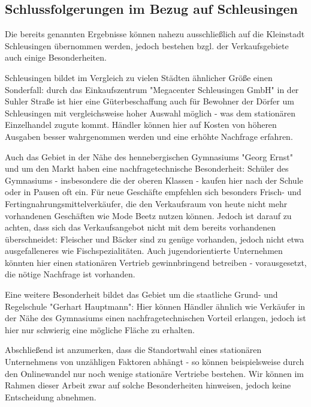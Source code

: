 \documentclass[a4paper, 12pt]{scrartcl}
\begin{document}
        \subsection{Schlussfolgerungen im Bezug auf Schleusingen}
        
        
        
        
        
        
        Die bereits genannten Ergebnisse können nahezu ausschließlich auf die Kleinstadt Schleusingen übernommen werden, jedoch bestehen bzgl. der Verkaufsgebiete auch einige Besonderheiten.

Schleusingen bildet im Vergleich zu vielen Städten ähnlicher Größe einen Sonderfall: durch das Einkaufszentrum "Megacenter Schleusingen GmbH" in der Suhler Straße ist hier eine Güterbeschaffung auch für Bewohner der Dörfer um Schleusingen mit vergleichsweise hoher Auswahl möglich - was dem stationären Einzelhandel zugute kommt. Händler können hier auf Kosten von höheren Ausgaben besser wahrgenommen werden und eine erhöhte Nachfrage erfahren. 

Auch das Gebiet in der Nähe des hennebergischen Gymnasiums "Georg Ernst" und um den Markt haben eine nachfragetechnische Besonderheit: Schüler des Gymnasiums - insbesondere die der oberen Klassen - kaufen hier nach der Schule oder in Pausen oft ein. Für neue Geschäfte empfehlen sich besonders Frisch- und Fertingnahrungsmittelverkäufer, die den Verkaufsraum von heute nicht mehr vorhandenen Geschäften wie Mode Beetz nutzen können. Jedoch ist darauf zu achten, dass sich das Verkaufsangebot nicht mit dem bereits vorhandenen überschneidet: Fleischer und Bäcker sind zu genüge vorhanden, jedoch nicht etwa ausgefalleneres wie Fischspezialitäten. Auch jugendorientierte Unternehmen könnten hier einen stationären Vertrieb gewinnbringend betreiben - vorausgesetzt, die nötige Nachfrage ist vorhanden.

Eine weitere Besonderheit bildet das Gebiet um die staatliche Grund- und Regelschule "Gerhart Hauptmann": Hier können Händler ähnlich wie Verkäufer in der Nähe des Gymnasiums einen nachfragetechnischen Vorteil erlangen, jedoch ist hier nur schwierig eine mögliche Fläche zu erhalten.

Abschließend ist anzumerken, dass die Standortwahl eines stationären Unternehmens von unzähligen Faktoren abhängt - so können beispielsweise durch den Onlinewandel nur noch wenige stationäre Vertriebe bestehen. Wir können im Rahmen dieser Arbeit zwar auf solche Besonderheiten hinweisen, jedoch keine Entscheidung abnehmen. 
\end{document}
